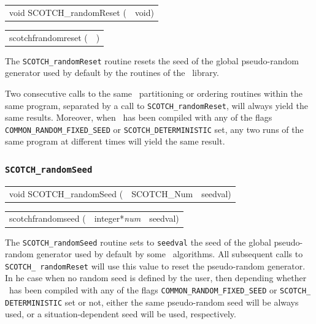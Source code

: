 \begin{itemize}
\progsyn

{\tt\begin{tabular}{l@{}l}
void SCOTCH\_randomReset ( & void)
\end{tabular}}

{\tt\begin{tabular}{l@{}l}
scotchfrandomreset ( & )
\end{tabular}}

\progdes

The {\tt SCOTCH\_randomReset} routine resets the seed of the
global pseudo-random generator used by default by the routines
of the \libscotch\ library.

Two consecutive calls to the same \libscotch\ partitioning or ordering
routines within the same program, separated by a call to
{\tt SCOTCH\_\lbt random\lbt Reset}, will always yield the same
results. Moreover, when \scotch\ has been compiled with any of the
flags {\tt COMMON\_\lbt RANDOM\_\lbt FIXED\_\lbt SEED} or
{\tt SCOTCH\_\lbt DETERMINISTIC} set, any two runs of the same program
at different times will yield the same result.

\end{itemize}

\subsubsection{{\tt SCOTCH\_randomSeed}}
\label{sec-lib-func-randomseed}

\begin{itemize}
\progsyn

{\tt\begin{tabular}{l@{}ll}
void SCOTCH\_randomSeed ( & SCOTCH\_Num & seedval)
\end{tabular}}

{\tt\begin{tabular}{l@{}ll}
scotchfrandomseed ( & integer*{\it num} & seedval)
\end{tabular}}

\progdes

The {\tt SCOTCH\_randomSeed} routine sets to {\tt seedval} the
seed of the global pseudo-random generator used by default by
some \scotch\ algorithms. All subsequent calls to {\tt SCOTCH\_\lbt
random\lbt Reset} will use this value to reset the pseudo-random
generator. In he case when no random seed is defined by the user, then
depending whether \scotch\ has been compiled with any of the flags
{\tt COMMON\_\lbt RANDOM\_\lbt FIXED\_\lbt SEED} or {\tt SCOTCH\_\lbt
DETERMINISTIC} set or not, either the same pseudo-random seed will be
always used, or a situation-dependent seed will be used,
respectively.
\end{itemize}

